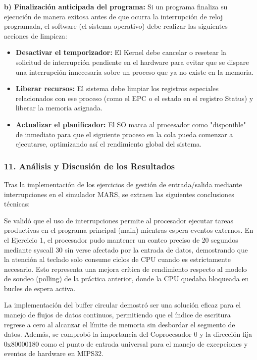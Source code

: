 \documentclass[12pt,a4paper]{article}
\begin{document}
\textbf{b) Finalización anticipada del programa:} Si un programa finaliza su ejecución de manera exitosa antes de que ocurra la interrupción de reloj programada, el software (el sistema operativo) debe realizar las siguientes acciones de limpieza:
\begin{itemize}
    \item \textbf{Desactivar el temporizador:} El Kernel debe cancelar o resetear la solicitud de interrupción pendiente en el hardware para evitar que se dispare una interrupción innecesaria sobre un proceso que ya no existe en la memoria.
    \item \textbf{Liberar recursos:} El sistema debe limpiar los registros especiales relacionados con ese proceso (como el EPC o el estado en el registro Status) y liberar la memoria asignada.
    \item \textbf{Actualizar el planificador:} El SO marca al procesador como "disponible" de inmediato para que el siguiente proceso en la cola pueda comenzar a ejecutarse, optimizando así el rendimiento global del sistema.
\end{itemize}

\subsubsection{11. Análisis y Discusión de los Resultados}

Tras la implementación de los ejercicios de gestión de entrada/salida mediante interrupciones en el simulador MARS, se extraen las siguientes conclusiones técnicas:

Se validó que el uso de interrupciones permite al procesador ejecutar tareas productivas en el programa principal (main) mientras espera eventos externos. En el Ejercicio 1, el procesador pudo mantener un conteo preciso de 20 segundos mediante syscall 30 sin verse afectado por la entrada de datos, demostrando que la atención al teclado solo consume ciclos de CPU cuando es estrictamente necesario. Esto representa una mejora crítica de rendimiento respecto al modelo de sondeo (polling) de la práctica anterior, donde la CPU quedaba bloqueada en bucles de espera activa.

La implementación del buffer circular demostró ser una solución eficaz para el manejo de flujos de datos continuos, permitiendo que el índice de escritura regrese a cero al alcanzar el límite de memoria sin desbordar el segmento de datos. Además, se comprobó la importancia del Coprocesador 0 y la dirección fija 0x80000180 como el punto de entrada universal para el manejo de excepciones y eventos de hardware en MIPS32.
\end{document}
